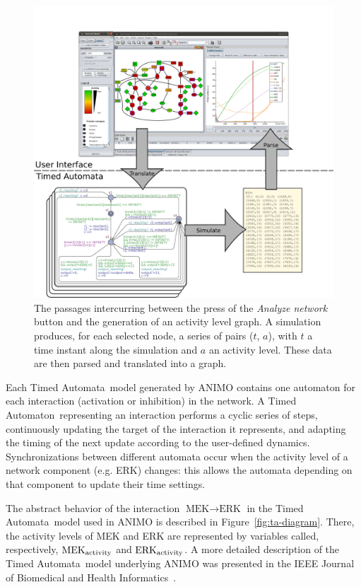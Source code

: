 \documentclass{bmcart}
\def\ta{Timed Automaton}
\def\tas{Timed Automata}
\begin{document}
\begin{figure}[htb]
\begin{minipage}{\textwidth}
  \includegraphics[width=\textwidth]{images/animo_simulation_workflow}
\caption{The passages intercurring between the press of the \emph{Analyze network} button
and the generation of an activity level graph.
A simulation produces, for each selected node, a series of pairs {\sf ($t$, $a$)},
with $t$ a time instant along the simulation and $a$ an activity level. These data are
then parsed and translated into a graph.}\label{fig:animo-sim-workflow}
\end{minipage}
\end{figure}

Each \tas\ model generated by ANIMO contains one automaton for each interaction (activation or inhibition) in the network.
A \ta\ representing an interaction performs a cyclic series of steps, continuously updating
the target of the interaction it represents, and adapting the timing of the next update according to
the user-defined dynamics. Synchronizations between different automata occur when the activity level of a network component (e.g. ERK)
changes: this allows the automata depending on that component to update their time settings.

The abstract behavior of the interaction $\mbox{MEK} \rightarrow \mbox{ERK}$ in the \tas\ model used in ANIMO is described in Figure~\ref{fig:ta-diagram}.
There, the activity levels of MEK and ERK are represented by variables called, respectively, $\mbox{MEK}_{\mbox{\scriptsize activity}}$
and $\mbox{ERK}_{\mbox{\scriptsize activity}}$. A more detailed description of the \tas\ model underlying ANIMO was
presented in the IEEE Journal of Biomedical and Health Informatics~\cite{animo-ieee}.
\end{document}
